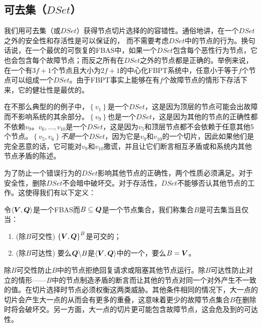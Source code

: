 \subsection{可去集（$DSet$）}
我们用可去集（或$DSet$）获得节点切片选择的的容错性。通俗地讲，在一个$DSet$之外的安全性和存活性是可以保证的，    而不需要考虑$DSet$中的节点的行为。换句话说，在一个最优的可恢复的FBAS中，如果一个$DSet$包含每个恶性行为节点，它也会包含每个故障节点；而反之所有在$DSet$之外的节点都是正确的。举例来说，在一个有$3f+1$个节点且{\quorum}大小为$2f+1$的中心化FBPT系统中，任意小于等于$f$个节点可以组成一个$DSet$。由于FBPT事实上能够在有$f$个故障节点的情形下存活下来，它的健壮性是最优的。

在不那么典型的的例子中，$\left\{v_1\right\}$是一个$DSet$，这是因为顶层的节点可能会出故障而不影响系统的其余部分。$\left\{v_9\right\}$也是一个$DSet$，这是因为其他的节点的正确性都不依赖$v_9$。$v_6,\ldots,v_{10}$是一个$DSet$，这是因为$v_5$和顶层节点都不会依赖于任意其他5个节点。$\left\{v_5,v_6\right\}$\textit{不是}一个$DSet$，因为它是$v_9$和$v_{10}$的一个切片，因此如果他们是完全恶意的话，它可能对$v_9$和$v_10$撒谎，并且让它们断言相互矛盾或和系统内其他节点矛盾的陈述。

为了防止一个错误行为的$DSet$影响其他节点的正确性，两个性质必须满足。对于安全性，删除$DSet$不会暗中破坏{\quorum}交。对于存活性，$DSet$不能够否认其他节点的工作{\quorum}。这使得我们有以下定义：

\begin{definition}[DSet]
        令$\langle{\bm V},{\bm Q}\rangle$是一个FBAS而$B\subseteq {\bm Q}$是一个节点集合，我们称集合$B$是可去集当且仅当：
        \begin{enumerate}
                \item (除$B${\quorum}可交性) $\left\{{\bm V},{\bm Q}\right\}^{B}$是{\quorum}可交的；
                \item (除$B${\quorum}可达性) 要么${\bm Q}\backslash B$是$\langle{\bm V},{\bm Q}\rangle$中的一个{\quorum}，要么$B={\bm V}$。
        \end{enumerate}
\end{definition}

除$B${\quorum}可交性防止$B$中的节点拒绝回复请求或阻塞其他节点运行。除$B${\quorum}可达性防止对立的情形——$B$中的节点制造矛盾的断言而让其他的节点对同一个{\slot}对外产生不一致的值。在切片选择时节点必须权衡这两类威胁。其他条件相同的情况下，大一点的切片会产生大一点的{\quorum}从而会有更多的重叠，这意味着更少的故障节点集合$B$在删除时将会破坏{\quorum}交。另一方面，大一点的切片更可能包含故障节点，这会危及到{\quorum}的可达性。

